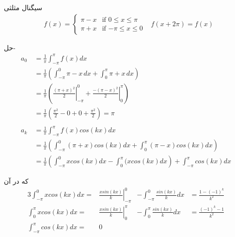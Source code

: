 \begin{example}
	
	سیگنال مثلثی
	\begin{align*}
		&f(x)=
		\begin{cases}
			\pi-x &\mbox{if  } { 0\le x\le \pi}
			\\
			\pi+x &\mbox{if  }  {-\pi\le x \le 0}
		\end{cases}
		&f(x+2\pi)=f(x)
	\end{align*}
	
	\hrulefill
	
	حل- 
	\begin{equation*}
		\begin{aligned}
			a_0 {} &\ = \frac{1}{\pi}\int_{-\pi}^\pi{f(x)dx}\\
			&\ =\frac{1}{\pi}\left(\int_{-\pi}^0{\pi-x \, dx}+\int_0^\pi{\pi+x \, dx}\right)\\
			&\ =\frac{1}{\pi}\left(
			\left.{\frac{(\pi+x)^2}{2}}\right |_{-\pi}^0
			+
			\left.{\frac{-(\pi-x)^2}{2}}\right |_0^\pi
			\right)\\
			&\ = \frac{1}{\pi}\left(
			\frac{\pi^2}{2}-0+0+\frac{\pi^2}{2}
			\right)= \pi
			\\\\
			a_k {} &\ = \frac{1}{\pi}\int_{-\pi}^\pi{f(x)cos(kx)dx}\\
			&\ = \frac{1}{\pi}\left(
			\int_{-\pi}^{0}{(\pi+x)cos(kx) dx} +\int_{0}^{\pi}{(\pi-x)cos(kx)dx}
			\right)\\
			&\ = \frac{1}{\pi}\left(
			\int_{-\pi}^{0}{xcos(kx) dx} -\int_{0}^{\pi}{(xcos(kx)dx}
			\right)
			+
			\int_{-\pi}^{\pi}{cos(kx)dx}
		\end{aligned}
	\end{equation*}
	
	که در آن 
	\begin{alignat*}{3}
		\int_{-\pi}^{0}{xcos(kx)dx}
		= & \left.{\frac{xsin(kx)}{k}}\right |_{-\pi}^{0} & -\int_{-\pi}^{0}{\frac{sin(kx)}{k}dx}
		&= \frac{1-(-1)^k}{k^2}
		\\
		\int_{0}^{\pi}{xcos(kx)dx}
		= & \left.{\frac{xsin(kx)}{k}}\right |_{0}^{\pi} & -\int_{0}^{\pi}{\frac{sin(kx)}{k}dx}
		&=\frac{(-1)^k-1}{k^2}
		\\
		\int_{-\pi}^{\pi}{cos(kx)dx}=& 0
	\end{alignat*}
	

\end{example}
